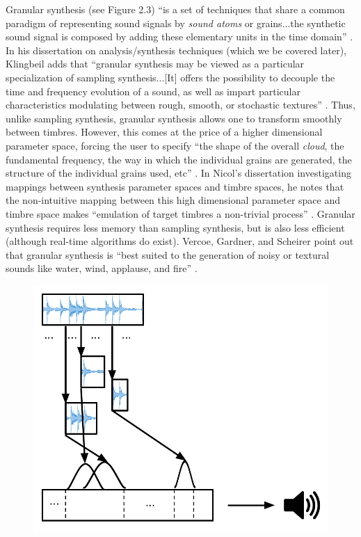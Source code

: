\documentclass[a4paper,12pt]{report} 	%
\numberwithin{figure}{chapter}
\numberwithin{table}{chapter}
\numberwithin{equation}{chapter}
\begin{document}
\begin{flushleft}
Granular synthesis (see Figure 2.3) ``is a set of techniques that share a common paradigm of representing sound signals by \emph{sound atoms} or grains...the synthetic sound signal is composed by adding these elementary units in the time domain'' \cite[p.13]{Tolonen:1998bh}. In his dissertation on analysis/synthesis techniques (which we be covered later), Klingbeil adds that ``granular synthesis may be viewed as a particular specialization of sampling synthesis...[It] offers the possibility to decouple the time and frequency evolution of a sound, as well as impart particular characteristics modulating between rough, smooth, or stochastic textures'' \cite[p. 6]{Klingbeil:2009lo}. Thus, unlike sampling synthesis, granular synthesis allows one to transform smoothly between timbres. However, this comes at the price of a higher dimensional parameter space, forcing the user to specify ``the shape of the overall \emph{cloud}, the fundamental frequency, the way in which the individual grains are generated, the structure of the individual grains used, etc'' \cite[p. 5]{Johnson:1998sh}. In Nicol's dissertation investigating mappings between synthesis parameter spaces and timbre spaces, he notes that the non-intuitive mapping between this high dimensional parameter space and timbre space makes ``emulation of target timbres a non-trivial process'' \cite[p. 49]{Nicol:2005rp}. Granular synthesis requires less memory than sampling synthesis, but is also less efficient (although real-time algorithms do exist). Vercoe, Gardner, and Scheirer point out that granular synthesis is ``best suited to the generation of noisy or textural sounds like water, wind, applause, and fire'' \cite[p. 6]{Vercoe:1998hh}.
\\
\begin{figure}[h!]
\begin{center}
\includegraphics[scale=0.8]{GranularSynthesis}

\end{center}
\end{figure}
\end{flushleft}
\end{document}
